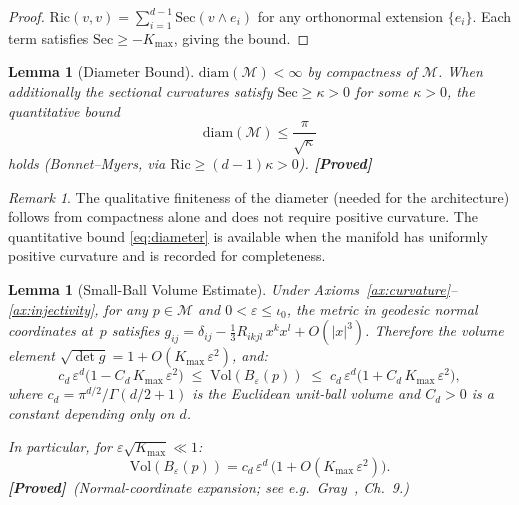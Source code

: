 \documentclass[11pt,a4paper]{article}
\newtheorem{lemma}[theorem]{Lemma}
\theoremstyle{definition}
\theoremstyle{remark}
\newtheorem{remark}[theorem]{Remark}
\newcommand{\Ric}{\mathrm{Ric}}
\newcommand{\Sec}{\mathrm{Sec}}
\newcommand{\diam}{\mathrm{diam}}
\newcommand{\Vol}{\mathrm{Vol}}
\newcommand{\statusproved}{\textcolor{green!50!black}{\textbf{[Proved]}}}
\begin{document}
\begin{proof}
$\Ric(v,v) = \sum_{i=1}^{d-1} \Sec(v \wedge e_i)$ for any 
orthonormal extension $\{e_i\}$. Each term satisfies 
$\Sec \geq -K_{\max}$, giving the bound.
\end{proof}


\begin{lemma}[Diameter Bound]\label{lem:diameter}
$\diam(\mathcal{M}) < \infty$ by compactness of $\mathcal{M}$. 
When additionally the sectional curvatures satisfy 
$\Sec \geq \kappa > 0$ for some $\kappa > 0$, the quantitative 
bound
\begin{equation}\label{eq:diameter}
    \diam(\mathcal{M}) \leq \frac{\pi}{\sqrt{\kappa}}
\end{equation}
holds (Bonnet--Myers, via $\Ric \geq (d-1)\kappa > 0$). 
\statusproved
\end{lemma}

\begin{remark}\label{rem:diameter}
The qualitative finiteness of the diameter (needed for 
the architecture) follows from compactness alone and does 
not require positive curvature. The quantitative bound 
\eqref{eq:diameter} is available when the manifold has 
uniformly positive curvature and is recorded for 
completeness.
\end{remark}


\begin{lemma}[Small-Ball Volume Estimate]\label{lem:volume}
Under Axioms~\ref{ax:curvature}--\ref{ax:injectivity}, for any 
$p \in \mathcal{M}$ and $0 < \varepsilon \leq \iota_0$, the 
metric in geodesic normal coordinates at~$p$ satisfies 
$g_{ij} = \delta_{ij} - \tfrac{1}{3}R_{ikjl}\,x^k x^l + O(|x|^3)$. 
Therefore the volume element 
$\sqrt{\det g} = 1 + O(K_{\max}\,\varepsilon^2)$, and:
\begin{equation}\label{eq:volume_small_ball}
    c_d\,\varepsilon^d\bigl(1 - C_d\,K_{\max}\,\varepsilon^2\bigr) 
    \;\leq\; \Vol(B_\varepsilon(p)) \;\leq\; 
    c_d\,\varepsilon^d\bigl(1 + C_d\,K_{\max}\,\varepsilon^2\bigr),
\end{equation}
where $c_d = \pi^{d/2}/\Gamma(d/2+1)$ is the Euclidean unit-ball 
volume and $C_d > 0$ is a constant depending only on $d$.

In particular, for $\varepsilon \sqrt{K_{\max}} \ll 1$:
\begin{equation}\label{eq:volume_leading}
    \Vol(B_\varepsilon(p)) = c_d\,\varepsilon^d\,
    \bigl(1 + O(K_{\max}\,\varepsilon^2)\bigr).
\end{equation}
\statusproved\ (Normal-coordinate expansion; see 
e.g.\ Gray~\cite{gray2004}, Ch.~9.)
\end{lemma}
\end{document}
